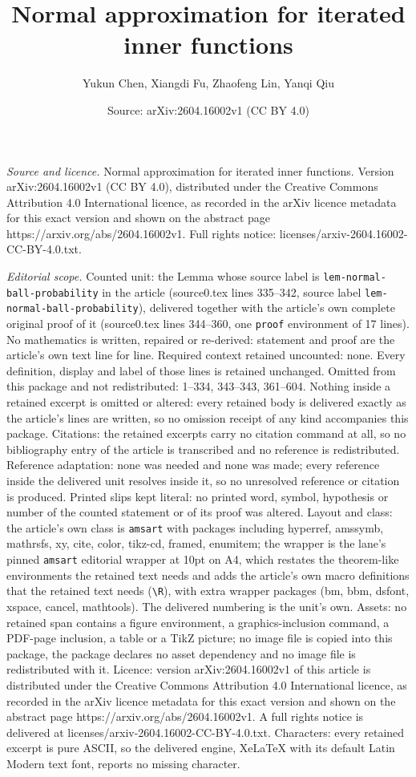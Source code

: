 \documentclass[10pt,a4paper]{amsart}
\title[Normal approximation for iterated inner functions]{Normal approximation for iterated inner functions}
\author{Yukun Chen, Xiangdi Fu, Zhaofeng Lin, Yanqi Qiu}
\date{Source: arXiv:2604.16002v1 (CC BY 4.0)}
\begin{document}
\maketitle

\noindent\emph{Source and licence.} Normal approximation for iterated inner functions. Version arXiv:2604.16002v1 (CC BY 4.0), distributed under the Creative Commons Attribution 4.0 International licence, as recorded in the arXiv licence metadata for this exact version and shown on the abstract page https://arxiv.org/abs/2604.16002v1. Full rights notice: licenses/arxiv-2604.16002-CC-BY-4.0.txt.\par\smallskip

\noindent\textit{Editorial scope.} Counted unit: the Lemma whose source label is \texttt{lem-normal-ball-probability} in the article (source0.tex lines 335--342, source label \texttt{lem-normal-ball-probability}), delivered together with the article's own complete original proof of it (source0.tex lines 344--360, one \texttt{proof} environment of 17 lines). No mathematics is written, repaired or re-derived: statement and proof are the article's own text line for line. Required context retained uncounted: none. Every definition, display and label of those lines is retained unchanged. Omitted from this package and not redistributed: 1--334, 343--343, 361--604. Nothing inside a retained excerpt is omitted or altered: every retained body is delivered exactly as the article's lines are written, so no omission receipt of any kind accompanies this package. Citations: the retained excerpts carry no citation command at all, so no bibliography entry of the article is transcribed and no reference is redistributed. Reference adaptation: none was needed and none was made; every reference inside the delivered unit resolves inside it, so no unresolved reference or citation is produced. Printed slips kept literal: no printed word, symbol, hypothesis or number of the counted statement or of its proof was altered. Layout and class: the article's own class is \texttt{amsart} with packages including hyperref, amssymb, mathrsfs, xy, cite, color, tikz-cd, framed, enumitem; the wrapper is the lane's pinned \texttt{amsart} editorial wrapper at 10pt on A4, which restates the theorem-like environments the retained text needs and adds the article's own macro definitions that the retained text needs (\texttt{\textbackslash R}), with extra wrapper packages (bm, bbm, dsfont, xspace, cancel, mathtools). The delivered numbering is the unit's own. Assets: no retained span contains a figure environment, a graphics-inclusion command, a PDF-page inclusion, a table or a TikZ picture; no image file is copied into this package, the package declares no asset dependency and no image file is redistributed with it. Licence: version arXiv:2604.16002v1 of this article is distributed under the Creative Commons Attribution 4.0 International licence, as recorded in the arXiv licence metadata for this exact version and shown on the abstract page https://arxiv.org/abs/2604.16002v1. A full rights notice is delivered at licenses/arxiv-2604.16002-CC-BY-4.0.txt. Characters: every retained excerpt is pure ASCII, so the delivered engine, XeLaTeX with its default Latin Modern text font, reports no missing character.
\end{document}
